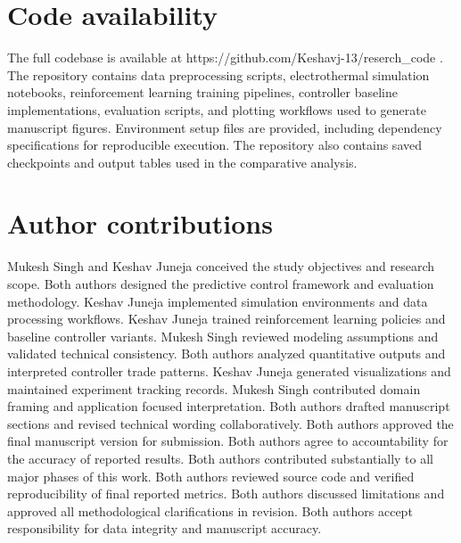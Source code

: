 \documentclass[twocolumn]{article}
\begin{document}
\section*{Code availability}
The full codebase is available at https://github.com/Keshavj-13/reserch_code \cite{KeshavRepo2026}. The repository contains data preprocessing scripts, electrothermal simulation notebooks, reinforcement learning training pipelines, controller baseline implementations, evaluation scripts, and plotting workflows used to generate manuscript figures. Environment setup files are provided, including dependency specifications for reproducible execution. The repository also contains saved checkpoints and output tables used in the comparative analysis.

\section*{Author contributions}
Mukesh Singh and Keshav Juneja conceived the study objectives and research scope. Both authors designed the predictive control framework and evaluation methodology. Keshav Juneja implemented simulation environments and data processing workflows. Keshav Juneja trained reinforcement learning policies and baseline controller variants. Mukesh Singh reviewed modeling assumptions and validated technical consistency. Both authors analyzed quantitative outputs and interpreted controller trade patterns. Keshav Juneja generated visualizations and maintained experiment tracking records. Mukesh Singh contributed domain framing and application focused interpretation. Both authors drafted manuscript sections and revised technical wording collaboratively. Both authors approved the final manuscript version for submission. Both authors agree to accountability for the accuracy of reported results. Both authors contributed substantially to all major phases of this work. Both authors reviewed source code and verified reproducibility of final reported metrics. Both authors discussed limitations and approved all methodological clarifications in revision. Both authors accept responsibility for data integrity and manuscript accuracy.
\end{document}
